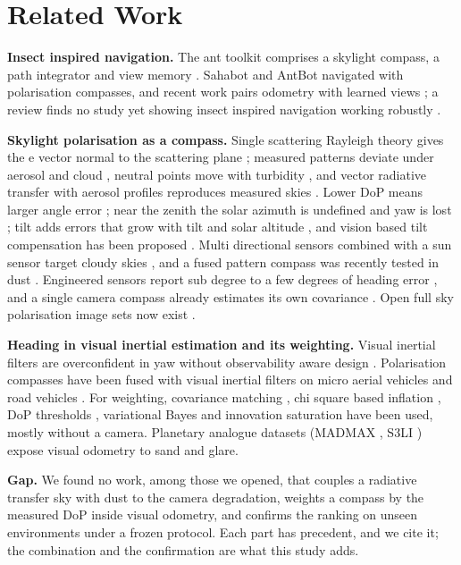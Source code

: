 \section{Related Work}
\textbf{Insect inspired navigation.} The ant toolkit comprises a skylight compass, a path integrator and view memory \cite{wehner03, muller07}. Sahabot \cite{lambrinos} and AntBot \cite{antbot} navigated with polarisation compasses, and recent work pairs odometry with learned views \cite{gattaux, firlefyn}; a review finds no study yet showing insect inspired navigation working robustly \cite{decroon}.

\textbf{Skylight polarisation as a compass.} Single scattering Rayleigh theory gives the e vector normal to the scattering plane \cite{suhai}; measured patterns deviate under aerosol and cloud \cite{horvath, pomozi, pust}, neutral points move with turbidity \cite{deleon25}, and vector radiative transfer with aerosol profiles reproduces measured skies \cite{zeng08}. Lower DoP means larger angle error \cite{ma15}; near the zenith the solar azimuth is undefined and yaw is lost \cite{liang20b, hu22}; tilt adds errors that grow with tilt and solar altitude \cite{liang}, and vision based tilt compensation has been proposed \cite{yuan25}. Multi directional sensors combined with a sun sensor target cloudy skies \cite{wang24}, and a fused pattern compass was recently tested in dust \cite{su26}. Engineered sensors report sub degree to a few degrees of heading error \cite{wang19, potter, hu22}, and a single camera compass already estimates its own covariance \cite{sturzl17}. Open full sky polarisation image sets now exist \cite{poughon24}.

\textbf{Heading in visual inertial estimation and its weighting.} Visual inertial filters \cite{mourikis, openvins, vinsmono, orbslam3} are overconfident in yaw without observability aware design \cite{hesch, huang_fej, limourikis}. Polarisation compasses have been fused with visual inertial filters on micro aerial vehicles \cite{steidle} and road vehicles \cite{chu23}. For weighting, covariance matching \cite{zhang20}, chi square based inflation \cite{amohead}, DoP thresholds \cite{zhang22}, variational Bayes and innovation saturation \cite{zhao, sun25} have been used, mostly without a camera. Planetary analogue datasets (MADMAX \cite{madmax}, S3LI \cite{giubilato26}) expose visual odometry to sand and glare.

\textbf{Gap.} We found no work, among those we opened, that couples a radiative transfer sky with dust to the camera degradation, weights a compass by the measured DoP inside visual odometry, and confirms the ranking on unseen environments under a frozen protocol. Each part has precedent, and we cite it; the combination and the confirmation are what this study adds.
